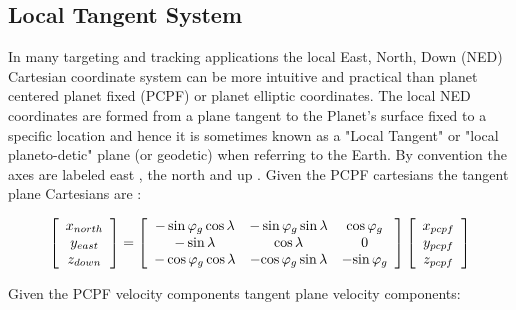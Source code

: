 \documentclass[twoside,11pt,titlepage]{report}
\begin{document}
\subsection{Local Tangent System}
In many targeting and tracking applications the local East, North, Down (NED) Cartesian coordinate system can be more intuitive and practical than planet centered planet fixed (PCPF) or planet elliptic coordinates. The local NED coordinates are formed from a plane tangent to the Planet's surface fixed to a specific location and hence it is sometimes known as a "Local Tangent" or "local planeto-detic" plane (or geodetic) when referring to the Earth. By convention the axes are labeled east , the north and up .
Given the PCPF cartesians the tangent plane Cartesians are  :

\begin{equation}
\left[ {\begin{array}{*{20}c}
   {x_{north} }  \\
   {y_{east} }  \\
   {z_{down} }  \\
\end{array}} \right] = \left[ {\begin{array}{*{20}c}
   { - \sin \varphi _g \cos \lambda } & { - \sin \varphi _g \sin \lambda } & {\cos \varphi _g }  \\
   { - \sin \lambda } & {\cos \lambda } & 0  \\
   {-\cos \varphi _g \cos \lambda } & -{\cos \varphi _g \sin \lambda } & -{\sin \varphi _g }  \\
\end{array}} \right]\left[ {\begin{array}{*{20}c}
   {x_{pcpf} }  \\
   {y_{pcpf} }  \\
   {z_{pcpf} }  \\
\end{array}} \right]
\end{equation}

Given the PCPF velocity components tangent plane velocity components:
\end{document}
